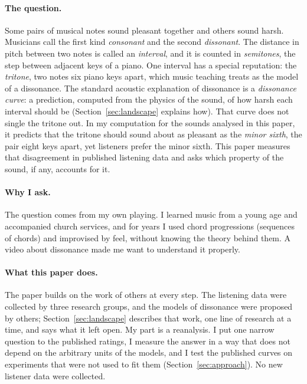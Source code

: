 \documentclass[11pt,a4paper]{article}
\begin{document}
\paragraph{The question.}
Some pairs of musical notes sound pleasant together and others sound harsh. Musicians call the
first kind \emph{consonant} and the second \emph{dissonant}. The distance in pitch between two
notes is called an \emph{interval}, and it is counted in \emph{semitones}, the step between
adjacent keys of a piano. One interval has a special reputation: the \emph{tritone}, two notes
six piano keys apart, which music teaching treats as the model of a dissonance. The standard
acoustic explanation of dissonance is a \emph{dissonance curve}: a prediction, computed from
the physics of the sound, of how harsh each interval should be
(Section~\ref{sec:landscape} explains how). That curve does not single the tritone out. In my
computation for the sounds analysed in this paper, it predicts that the tritone should sound
about as pleasant as the \emph{minor sixth}, the pair eight keys apart, yet listeners prefer
the minor sixth. This paper measures that disagreement in published listening data and asks
which property of the sound, if any, accounts for it.

\paragraph{Why I ask.}
The question comes from my own playing. I learned music from a young age and accompanied
church services, and for years I used chord progressions (sequences of chords) and improvised
by feel, without knowing the theory behind them. A video about dissonance made me want to understand it properly.

\paragraph{What this paper does.}
The paper builds on the work of others at every step. The listening data were collected by
three research groups, and the models of dissonance were proposed by others;
Section~\ref{sec:landscape} describes that work, one line of research at a time, and says what it left open.
My part is a reanalysis. I put one narrow question to the published ratings, I measure the
answer in a way that does not depend on the arbitrary units of the models, and I test the
published curves on experiments that were not used to fit them
(Section~\ref{sec:approach}). No new listener data were collected.
\end{document}
